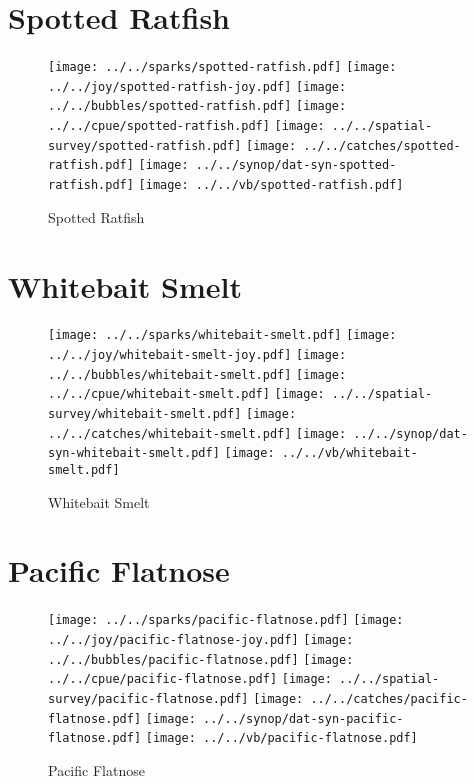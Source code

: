 \section{Spotted Ratfish}

\begin{figure}[htbp]
\centering
\texttt{[image: ../../sparks/spotted-ratfish.pdf]}
\texttt{[image: ../../joy/spotted-ratfish-joy.pdf]}
\texttt{[image: ../../bubbles/spotted-ratfish.pdf]}
\texttt{[image: ../../cpue/spotted-ratfish.pdf]}
\texttt{[image: ../../spatial-survey/spotted-ratfish.pdf]}
\texttt{[image: ../../catches/spotted-ratfish.pdf]}
\texttt{[image: ../../synop/dat-syn-spotted-ratfish.pdf]}
\texttt{[image: ../../vb/spotted-ratfish.pdf]}
\caption{Spotted Ratfish}
\end{figure}
\clearpage
\section{Whitebait Smelt}

\begin{figure}[htbp]
\centering
\texttt{[image: ../../sparks/whitebait-smelt.pdf]}
\texttt{[image: ../../joy/whitebait-smelt-joy.pdf]}
\texttt{[image: ../../bubbles/whitebait-smelt.pdf]}
\texttt{[image: ../../cpue/whitebait-smelt.pdf]}
\texttt{[image: ../../spatial-survey/whitebait-smelt.pdf]}
\texttt{[image: ../../catches/whitebait-smelt.pdf]}
\texttt{[image: ../../synop/dat-syn-whitebait-smelt.pdf]}
\texttt{[image: ../../vb/whitebait-smelt.pdf]}
\caption{Whitebait Smelt}
\end{figure}
\clearpage
\section{Pacific Flatnose}

\begin{figure}[htbp]
\centering
\texttt{[image: ../../sparks/pacific-flatnose.pdf]}
\texttt{[image: ../../joy/pacific-flatnose-joy.pdf]}
\texttt{[image: ../../bubbles/pacific-flatnose.pdf]}
\texttt{[image: ../../cpue/pacific-flatnose.pdf]}
\texttt{[image: ../../spatial-survey/pacific-flatnose.pdf]}
\texttt{[image: ../../catches/pacific-flatnose.pdf]}
\texttt{[image: ../../synop/dat-syn-pacific-flatnose.pdf]}
\texttt{[image: ../../vb/pacific-flatnose.pdf]}
\caption{Pacific Flatnose}
\end{figure}
\clearpage
